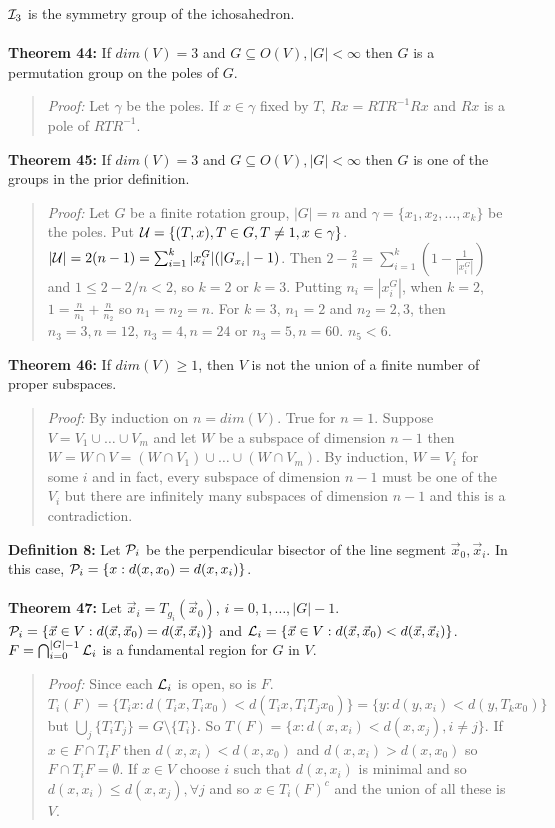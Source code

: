 ${\cal I}_3$ is the symmetry group of the ichosahedron.
\\
\\
{\bf Theorem 44:}  
If $dim(V)=3$ and $G \subseteq O(V), |G|< \infty$ then 
$G$ is a permutation group on the poles of $G$.
\begin{quote}
\emph{Proof:}  
Let $\gamma$ be the poles.  If $x \in \gamma$ fixed by $T$, $Rx= RTR^{-1} Rx$ and 
$Rx$ is a pole of $RTR^{-1}$.
\end{quote}
{\bf Theorem 45:}
If $dim(V)=3$ and $G \subseteq O(V), |G|< \infty$ then 
$G$ is one of the groups in the prior definition.
\begin{quote}
\emph{Proof:}  
Let $G$ be a finite rotation group, $|G|=n$ and $\gamma = \{ x_1 , x_2 , \ldots , x_k \}$ be the
poles.
Put ${\cal U}= \{ (T,x), T \in G, T \ne 1, x \in \gamma \}$.
$|{\cal U}|= 2(n-1)= \sum_{i=1}^k |x_i^G| (|G_{x_i}| -1)$.  Then
$2- {\frac 2 n} = \sum_{i=1}^k (1- {\frac 1 {|x_i^G|}})$ and
$ 1 \le 2-2/n<2$, so $k=2$ or $k=3$.  Putting $n_i= |x_i^G|$,
when $k=2$, $1= {\frac {n} {n_1}} + {\frac n {n_2}}$ so $n_1 = n_2 =n$.
For $k=3$, $n_1=2$ and $n_2= 2,3$, then
$n_3= 3, n=12$, $n_3= 4, n=24$ or $n_3=5, n=60$.  $n_5<6$.
\end{quote}
{\bf Theorem 46:} If $dim(V) \ge 1$, then $V$ is not the union of a finite number of
proper subspaces.
\begin{quote}
\emph{Proof:}  
By induction on $n= dim(V)$.  True for $n=1$.  Suppose
$V= V_1 \cup \ldots \cup V_m$ and let $W$ be a subspace of dimension  $n-1$ then
$W= W \cap V= (W \cap V_1) \cup \ldots \cup (W \cap V_m)$.  By induction, $W= V_i$
for some $i$ and in fact, every subspace of dimension $n-1$ must be one of the $V_i$
but there are infinitely many subspaces of dimension $n-1$ and this is a contradiction.
\end{quote}
{\bf Definition 8:}  Let 
${\cal P}_i$ be the perpendicular bisector of the line segment ${\vec x}_0, {\vec x}_i$.  In this case,
${\cal P}_i = \{x: d(x, x_0) = d(x, x_i) \}$.
\\
\\
{\bf Theorem 47:}
Let ${\vec x}_i= T_{g_i} ({\vec x}_0)$, $i= 0,1, \ldots, |G|-1$.
${\cal P}_i = \{ {\vec x} \in V: d({\vec x}, {\vec x}_0)= d({\vec x}, {\vec x}_i) \}$ and
${\cal L}_i= \{ {\vec x} \in V: d({\vec x}, {\vec x}_0) < d({\vec x}, {\vec x}_i) \}$.
$F= \bigcap_{i=0}^{|G|-1} {\cal L}_i$ is a fundamental region for $G$ in $V$.
\begin{quote}
\emph{Proof:}  Since each ${\cal L}_i$ is open, so is $F$.
$T_i(F)= \{T_ix: d(T_ix,T_ix_0) < d(T_ix, T_iT_jx_0) \}= \{y: d(y, x_i) < d(y, T_k x_0) \}$ but
$\bigcup_j \{T_iT_j \}= G \setminus  \{T_i \}$.  So
$T(F)= \{x: d(x,x_i) < d(x, x_j), i \ne j \}$.  If $x \in F \cap T_iF$ then
$d(x,x_i)<d(x,x_0)$ and
$d(x,x_i)>d(x,x_0)$ so $F \cap T_i F= \emptyset$.  If $x \in V$ choose $i$ such that
$d(x, x_i)$ is minimal and so $d(x, x_i) \le d(x, x_j), \forall j$ and so
$x \in T_i(F)^c$ and the union of all these is $V$.
\end{quote}
